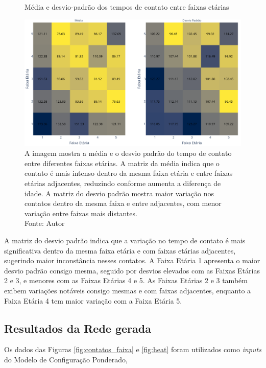 \begin{figure}[H]
    \centering
    \captionsetup{font=normalsize,skip=0.8pt,singlelinecheck=on,labelsep=endash}
    \caption{Média e desvio-padrão dos tempos de contato entre faixas etárias}
    \includegraphics[scale= 0.35]{figuras/media_std.png}
    \captionsetup{font=small,justification=justified}
    \caption*{A imagem mostra a média e o desvio padrão do tempo de contato entre diferentes faixas etárias. A matriz da média indica que o contato é mais intenso dentro da mesma faixa etária e entre faixas etárias adjacentes, reduzindo conforme aumenta a diferença de idade. A matriz do desvio padrão mostra maior variação nos contatos dentro da mesma faixa e entre adjacentes, com menor variação entre faixas mais distantes. \\Fonte: Autor}
    \label{fig:mediastd}
\end{figure}

A matriz do desvio padrão indica que a variação no tempo de contato é mais significativa dentro da mesma faixa etária e com faixas etárias adjacentes, sugerindo maior inconstância nesses contatos. A Faixa Etária 1 apresenta o maior desvio padrão consigo mesma, seguido por desvios elevados com as Faixas Etárias 2 e 3, e menores com as Faixas Etárias 4 e 5. As Faixas Etárias 2 e 3 também exibem variações notáveis consigo mesmas e com faixas adjacentes, enquanto a Faixa Etária 4 tem maior variação com a Faixa Etária 5.

\subsection{Resultados da Rede gerada}

Os dados das Figuras \ref{fig:contatos_faixa} e \ref{fig:heat} foram utilizados como \textit{inputs} do Modelo de Configuração Ponderado, 

